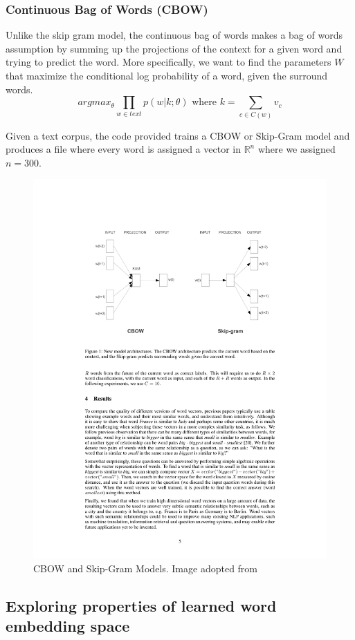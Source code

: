 \subsubsection{Continuous Bag of Words (CBOW)}
Unlike the skip gram model, the continuous bag of words makes a bag of words assumption by summing up the projections of the context for a given word and trying to predict the word. More specifically, we want to find the parameters $W$ that maximize the conditional log probability of a word, given the surround words. 
\begin{equation}
	argmax_{\theta} \prod_{w\in text} p(w|k;\theta) \text{ where } k = \sum_{c \in C(w)} v_c
\end{equation}



Given a text corpus, the code provided trains a CBOW or Skip-Gram model and produces a file where every word is assigned a vector in $\mathbb{R}^n$ where we assigned $n=300$.


\begin{figure}[h]
\centering
\includegraphics[width=\textwidth]{./images/model_images.pdf}
\caption{CBOW and Skip-Gram Models. Image adopted from \cite{mikolov1}}
\label{fig:top_k}
\end{figure}

\clearpage 


\subsection{Exploring properties of learned word embedding space}